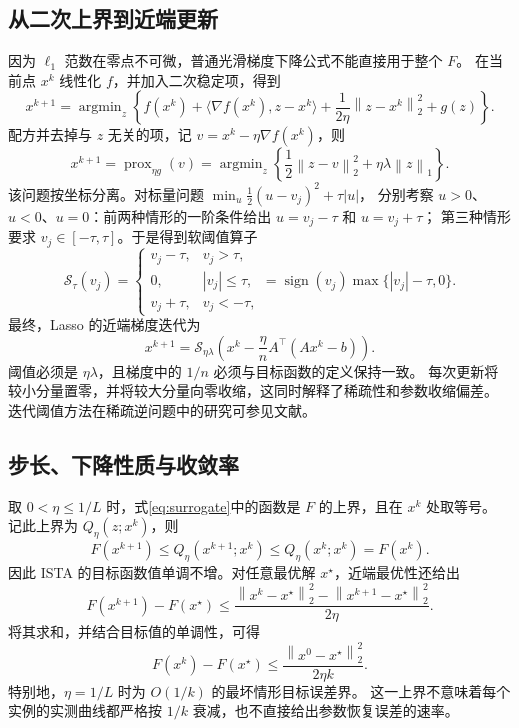 \documentclass[UTF8,11pt,a4paper,fontset=fandol]{ctexart}
\newcommand{\soft}{\mathcal{S}}
\newcommand{\norm}[1]{\left\|#1\right\|}
\begin{document}
\subsection{从二次上界到近端更新}
因为 $\ell_1$ 范数在零点不可微，普通光滑梯度下降公式不能直接用于整个 $F$。
在当前点 $x^k$ 线性化 $f$，并加入二次稳定项，得到
\begin{equation}
 x^{k+1}=\mathop{\arg\min}_{z}\left\{
 f(x^k)+\langle\nabla f(x^k),z-x^k\rangle
 +\frac{1}{2\eta}\norm{z-x^k}_2^2+g(z)\right\}.
 \label{eq:surrogate}
\end{equation}
配方并去掉与 $z$ 无关的项，记 $v=x^k-\eta\nabla f(x^k)$，则
\begin{equation}
 x^{k+1}=\operatorname{prox}_{\eta g}(v)
 =\mathop{\arg\min}_{z}\left\{\frac12\norm{z-v}_2^2+\eta\lambda\norm{z}_1\right\}.
\end{equation}
该问题按坐标分离。对标量问题 $\min_u\frac12(u-v_j)^2+\tau|u|$，
分别考察 $u>0$、$u<0$、$u=0$：前两种情形的一阶条件给出 $u=v_j-\tau$ 和 $u=v_j+\tau$；
第三种情形要求 $v_j\in[-\tau,\tau]$。于是得到软阈值算子
\begin{equation}
 \soft_\tau(v_j)=\begin{cases}
 v_j-\tau,&v_j>\tau,\\
 0,&|v_j|\le\tau,\\
 v_j+\tau,&v_j<-\tau,
 \end{cases}
 =\operatorname{sign}(v_j)\max\{|v_j|-\tau,0\}.
\end{equation}
最终，Lasso 的近端梯度迭代为
\begin{equation}
 \boxed{x^{k+1}=\soft_{\eta\lambda}\!\left(x^k-\frac{\eta}{n}A^\top(Ax^k-b)\right).}
 \label{eq:ista}
\end{equation}
阈值必须是 $\eta\lambda$，且梯度中的 $1/n$ 必须与目标函数的定义保持一致。
每次更新将较小分量置零，并将较大分量向零收缩，这同时解释了稀疏性和参数收缩偏差。
迭代阈值方法在稀疏逆问题中的研究可参见文献\cite{daubechies}。

\subsection{步长、下降性质与收敛率}
取 $0<\eta\le1/L$ 时，式\eqref{eq:surrogate}中的函数是 $F$ 的上界，且在 $x^k$ 处取等号。
记此上界为 $Q_\eta(z;x^k)$，则
\begin{equation}
 F(x^{k+1})\le Q_\eta(x^{k+1};x^k)
 \le Q_\eta(x^k;x^k)=F(x^k).
\end{equation}
因此 ISTA 的目标函数值单调不增。对任意最优解 $x^\star$，近端最优性还给出
\begin{equation}
 F(x^{k+1})-F(x^\star)
 \le\frac{\norm{x^k-x^\star}_2^2-\norm{x^{k+1}-x^\star}_2^2}{2\eta}.
\end{equation}
将其求和，并结合目标值的单调性，可得
\begin{equation}
 F(x^k)-F(x^\star)\le\frac{\norm{x^0-x^\star}_2^2}{2\eta k}.
 \label{eq:istarate}
\end{equation}
特别地，$\eta=1/L$ 时为 $O(1/k)$ 的最坏情形目标误差界\cite{beck}。
这一上界不意味着每个实例的实测曲线都严格按 $1/k$ 衰减，也不直接给出参数恢复误差的速率。
\end{document}
